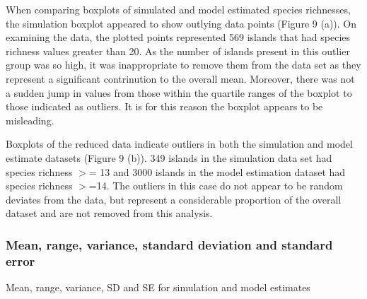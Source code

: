 \documentclass{article}
\begin{document}
When comparing boxplots of simulated and model estimated species richnesses, the simulation boxplot appeared to show outlying data points (Figure 9 (a)). On examining the data, the plotted points represented 569 islands that had species richness values greater than 20. As the number of islands present in this outlier group was so high, it was inappropriate to remove them from the data set as they represent a significant contrinution to the overall mean. Moreover, there was not a sudden jump in values from those within the quartile ranges of the boxplot to those indicated as outliers. It is for this reason the boxplot appears to be misleading.  \bigskip

Boxplots of the reduced data indicate outliers in both the simulation and model estimate datasets (Figure 9 (b)). 349 islands in the simulation data set had species richness $>$= 13 and 3000 islands in the model estimation dataset had species richness $>$=14. The outliers in this case do not appear to be random deviates from the data, but represent a considerable proportion of the overall dataset and are not removed from this analysis.  

\subsubsection{Mean, range, variance, standard deviation and standard error}

\begin{table}[h!]
\caption{Mean, range, variance, SD and SE for simulation and model estimates}
\centering
{}
   \end{table}\bigskip
    
\end{document}
